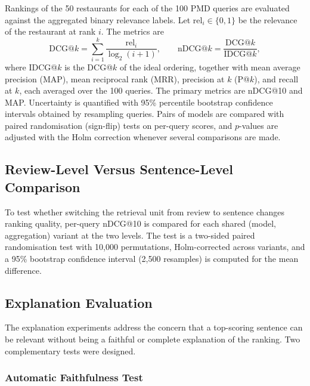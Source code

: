 Rankings of the 50 restaurants for each of the 100 PMD queries are evaluated against the aggregated binary relevance labels. Let $\mathrm{rel}_i\in\{0,1\}$ be the relevance of the restaurant at rank $i$. The metrics are
\begin{equation}
\mathrm{DCG@}k=\sum_{i=1}^{k}\frac{\mathrm{rel}_i}{\log_2(i+1)},\qquad
\mathrm{nDCG@}k=\frac{\mathrm{DCG@}k}{\mathrm{IDCG@}k},
\end{equation}
where IDCG@$k$ is the DCG@$k$ of the ideal ordering, together with mean average precision (MAP), mean reciprocal rank (MRR), precision at $k$ (P@$k$), and recall at $k$, each averaged over the 100 queries. The primary metrics are nDCG@10 and MAP. Uncertainty is quantified with 95\% percentile bootstrap confidence intervals obtained by resampling queries. Pairs of models are compared with paired randomisation (sign-flip) tests on per-query scores, and $p$-values are adjusted with the Holm correction whenever several comparisons are made.

\subsection{Review-Level Versus Sentence-Level Comparison}
\label{sec:a5design}

To test whether switching the retrieval unit from review to sentence changes ranking quality, per-query nDCG@10 is compared for each shared (model, aggregation) variant at the two levels. The test is a two-sided paired randomisation test with 10,000 permutations, Holm-corrected across variants, and a 95\% bootstrap confidence interval (2,500 resamples) is computed for the mean difference.

\subsection{Explanation Evaluation}
\label{sec:explaineval}

The explanation experiments address the concern that a top-scoring sentence can be relevant without being a faithful or complete explanation of the ranking. Two complementary tests were designed.

\subsubsection{Automatic Faithfulness Test}
\label{sec:b1design}

